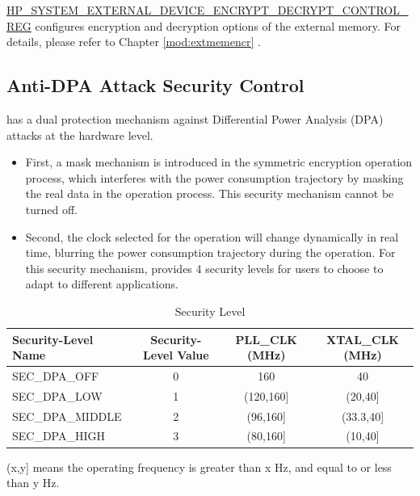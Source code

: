\documentclass[main\_\_EN.tex]{subfiles}
\begin{document}
\hyperref[regdesc:HPSYSTEMEXTERNALDEVICEENCRYPTDECRYPTCONTROLREG]{HP\_SYSTEM\_EXTERNAL\_DEVICE\_ENCRYPT\_DECRYPT\_CONTROL\_REG} configures encryption and decryption options of the external memory. For details, please refer to Chapter \ref{mod:extmemencr}
\textit{}.


\subsection{Anti-DPA Attack Security Control}
\label{sec:sysreg-anti-dpa-attack-security-control}

\chipname{} has a dual protection mechanism against Differential Power Analysis (DPA) attacks at the hardware level.

\begin{itemize}
    \item First, a mask mechanism is introduced in the symmetric encryption operation process, which interferes with the power consumption trajectory by masking the real data in the operation process. This security mechanism cannot be turned off.
    \item Second, the clock selected for the operation will change dynamically in real time, blurring the power consumption trajectory during the operation. For this security mechanism, \chipname{} provides 4 security levels for users to choose to adapt to different applications.
\end{itemize}


\begin{table}[H]
    \centering
    \caption{Security Level}
    \label{tab:sysreg-security-level}
    \begin{threeparttable}
    \begin{tabular}[c]{| l | c | c | c |}
    \hline
    \rowcolor{lightgray}
        \textbf{Security-Level Name} & \textbf{Security-Level Value} & \textbf{PLL\_CLK (MHz)} & \textbf{XTAL\_CLK (MHz)} \\ \hline
        SEC\_DPA\_OFF       & 0    & 160          & 40         \\\hline
        SEC\_DPA\_LOW       & 1    & (120,160]\tnote{A}   & (20,40]\tnote{A}   \\\hline
        SEC\_DPA\_MIDDLE    & 2    & (96,160]\tnote{A}    & (33.3,40]\tnote{A} \\\hline
        SEC\_DPA\_HIGH      & 3    & (80,160]\tnote{A}    & (10,40]\tnote{A}   \\\hline
    \end{tabular}
    \begin{tablenotes}
        \item[A] (x,y] means the operating frequency is greater than x Hz, and equal to or less than y Hz.
    \end{tablenotes}
    \end{threeparttable}
\end{table}
\end{document}
